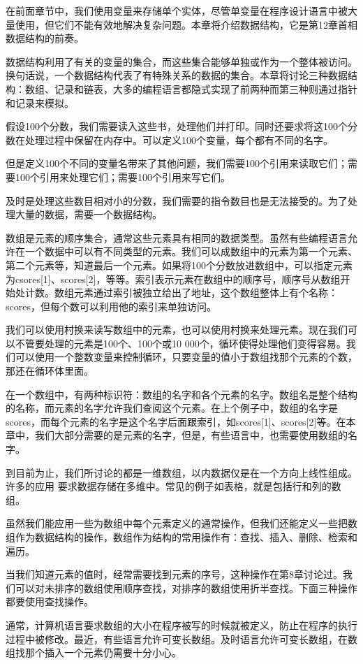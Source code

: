 
在前面章节中，我们使用变量来存储单个实体，尽管单变量在程序设计语言中被大量使用，但它们不能有效地解决复杂问题。本章将介绍数据结构，它是第12章首相数据结构的前奏。

数据结构利用了有关的变量的集合，而这些集合能够单独或作为一个整体被访问。换句话说，一个数据结构代表了有特殊关系的数据的集合。本章将讨论三种数据结构：数组、记录和链表，大多的编程语言都隐式实现了前两种而第三种则通过指针和记录来模拟。

假设100个分数，我们需要读入这些书，处理他们并打印。同时还要求将这100个分数在处理过程中保留在内存中。可以定义100个变量，每个都有不同的名字。

但是定义100个不同的变量名带来了其他问题，我们需要100个引用来读取它们；需要100个引用来处理它们；需要100个引用来写它们。

及时是处理这些数目相对小的分数，我们需要的指令数目也是无法接受的。为了处理大量的数据，需要一个数据结构。

数组是元素的顺序集合，通常这些元素具有相同的数据类型。虽然有些编程语言允许在一个数据中可以有不同类型的元素。我们可以成数组中的元素为第一个元素、第二个元素等，知道最后一个元素。如果将100个分数放进数组中，可以指定元素为csores[1]、scores[2]，等等。索引表示元素在数组中的顺序号，顺序号从数组开始处计数。数组元素通过索引被独立给出了地址，这个数组整体上有个名称：scores，但每个数可以利用他的索引来单独访问。

我们可以使用村换来读写数组中的元素，也可以使用村换来处理元素。现在我们可以不管要处理的元素是100个、100个或10 000个，循环使得处理他们变得容易。我们可以使用一个整数变量来控制循环，只要变量的值小于数组找那个元素的个数，那还在循环体里面。

在一个数组中，有两种标识符：数组的名字和各个元素的名字。数组名是整个结构的名称，而元素的名字允许我们查阅这个元素。在上个例子中，数组的名字是scores，而每个元素的名字是这个名字后面跟索引，如scores[1]、scores[2]等。在本章中，我们大部分需要的是元素的名字，但是，有些语言中，也需要使用数组的名字。

到目前为止，我们所讨论的都是一维数组，以内数据仅是在一个方向上线性组成。许多的应用 要求数据存储在多维中。常见的例子如表格，就是包括行和列的数组。

虽然我们能应用一些为数组中每个元素定义的通常操作，但我们还能定义一些把数组作为数据结构的操作，数组作为结构的常用操作有：查找、插入、删除、检索和遍历。

当我们知道元素的值时，经常需要找到元素的序号，这种操作在第8章讨论过。我们可以对未排序的数组使用顺序查找，对排序的数组使用折半查找。下面三种操作都要使用查找操作。

通常，计算机语言要求数组的大小在程序被写的时候就被定义，防止在程序的执行过程中被修改。最近，有些语言允许可变长数组。及时语言允许可变长数组，在数组找那个插入一个元素仍需要十分小心。

